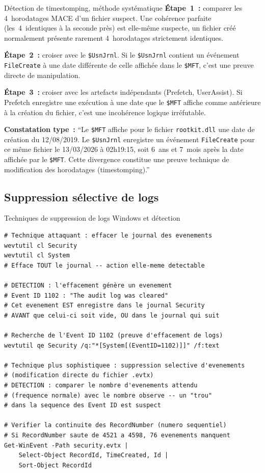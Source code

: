 \begin{boxscenario}{Détection de timestomping, méthode systématique}
\textbf{Étape~1~:} comparer les 4~horodatages MACE d'un fichier suspect.
Une cohérence parfaite (les~4~identiques à la seconde près) est
elle-même suspecte, un fichier créé normalement présente rarement
4~horodatages strictement identiques.

\textbf{Étape~2~:} croiser avec le \texttt{\$UsnJrnl}. Si le
\texttt{\$UsnJrnl} contient un événement \texttt{FileCreate} à une
date différente de celle affichée dans le \texttt{\$MFT}, c'est
une preuve directe de manipulation.

\textbf{Étape~3~:} croiser avec les artefacts indépendants
(Prefetch, UserAssist). Si Prefetch enregistre une exécution à
une date que le \texttt{\$MFT} affiche comme antérieure à la
création du fichier, c'est une incohérence logique irréfutable.

\textbf{Constatation type~:}
``Le \texttt{\$MFT} affiche pour le fichier \texttt{rootkit.dll}
une date de création du 12/08/2019. Le \texttt{\$UsnJrnl} enregistre
un événement \texttt{FileCreate} pour ce même fichier le 13/03/2026
à 02h19:15, soit 6~ans et 7~mois après la date affichée par le
\texttt{\$MFT}. Cette divergence constitue une preuve technique
de modification des horodatages (timestomping).''
\end{boxscenario}

\subsection{Suppression sélective de logs}

\begin{boxoutils}{Techniques de suppression de logs Windows et détection}
\begin{lstlisting}[language=bash_forensique]
# Technique attaquant : effacer le journal des evenements
wevtutil cl Security
wevtutil cl System
# Efface TOUT le journal -- action elle-meme detectable

# DETECTION : l'effacement génère un evenement
# Event ID 1102 : "The audit log was cleared"
# Cet evenement EST enregistre dans le journal Security
# AVANT que celui-ci soit vide, OU dans le journal qui suit

# Recherche de l'Event ID 1102 (preuve d'effacement de logs)
wevtutil qe Security /q:"*[System[(EventID=1102)]]" /f:text

# Technique plus sophistiquee : suppression selective d'evenements
# (modification directe du fichier .evtx)
# DETECTION : comparer le nombre d'evenements attendu
# (frequence normale) avec le nombre observe -- un "trou"
# dans la sequence des Event ID est suspect

# Verifier la continuite des RecordNumber (numero sequentiel)
# Si RecordNumber saute de 4521 a 4598, 76 evenements manquent
Get-WinEvent -Path security.evtx |
    Select-Object RecordId, TimeCreated, Id |
    Sort-Object RecordId
\end{lstlisting}
\end{boxoutils}

